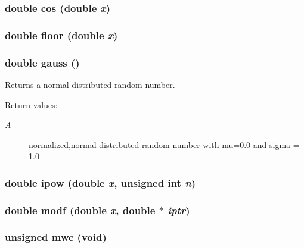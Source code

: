 \subsubsection{\setlength{\rightskip}{0pt plus 5cm}double cos (double {\em x})}\label{hpmath_8h_a44}


\subsubsection{\setlength{\rightskip}{0pt plus 5cm}double floor (double {\em x})}\label{hpmath_8h_a46}


\subsubsection{\setlength{\rightskip}{0pt plus 5cm}double gauss ()}\label{hpmath_8h_a49}


Returns a normal distributed random number.

\begin{Desc}
\item[Return values: ]\par
\begin{description}
\item[{\em 
A}]normalized,normal-distributed random number with mu=0.0 and sigma = 1.0 \end{description}
\end{Desc}
\subsubsection{\setlength{\rightskip}{0pt plus 5cm}double ipow (double {\em x}, unsigned int {\em n})}\label{hpmath_8h_a32}


\subsubsection{\setlength{\rightskip}{0pt plus 5cm}double modf (double {\em x}, double $\ast$ {\em iptr})}\label{hpmath_8h_a35}


\subsubsection{\setlength{\rightskip}{0pt plus 5cm}unsigned mwc (void)}\label{hpmath_8h_a47}


